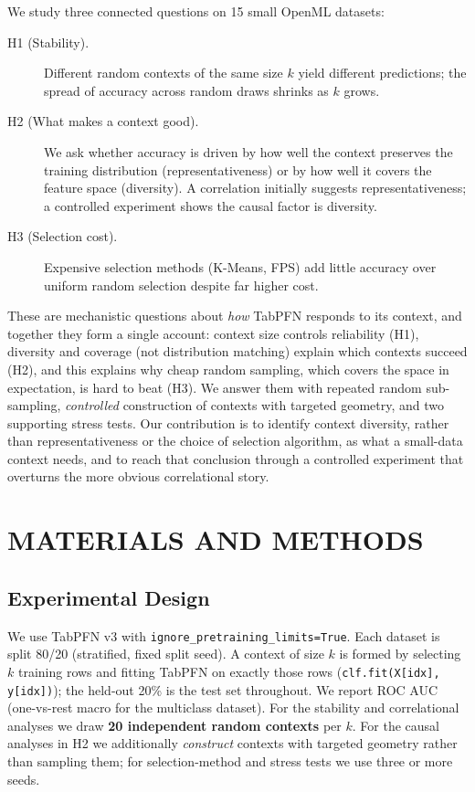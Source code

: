 \documentclass{article}
\begin{document}
We study three connected questions on 15 small OpenML datasets:

\begin{description}
\item[H1 (Stability).] Different random contexts of the same size $k$ yield different predictions; the spread of accuracy across random draws shrinks as $k$ grows.
\item[H2 (What makes a context good).] We ask whether accuracy is driven by how well the context preserves the training distribution (representativeness) or by how well it covers the feature space (diversity). A correlation initially suggests representativeness; a controlled experiment shows the causal factor is diversity.
\item[H3 (Selection cost).] Expensive selection methods (K-Means, FPS) add little accuracy over uniform random selection despite far higher cost.
\end{description}

These are mechanistic questions about \emph{how} TabPFN responds to its context, and together they form a single account: context size controls reliability (H1), diversity and coverage (not distribution matching) explain which contexts succeed (H2), and this explains why cheap random sampling, which covers the space in expectation, is hard to beat (H3). We answer them with repeated random sub-sampling, \emph{controlled} construction of contexts with targeted geometry, and two supporting stress tests. Our contribution is to identify context diversity, rather than representativeness or the choice of selection algorithm, as what a small-data context needs, and to reach that conclusion through a controlled experiment that overturns the more obvious correlational story.

\section{MATERIALS AND METHODS}

\subsection{Experimental Design}

We use TabPFN v3 with \texttt{ignore\_pretraining\_limits=True}. Each dataset is split 80/20 (stratified, fixed split seed). A context of size $k$ is formed by selecting $k$ training rows and fitting TabPFN on exactly those rows (\texttt{clf.fit(X[idx], y[idx])}); the held-out 20\% is the test set throughout. We report ROC AUC (one-vs-rest macro for the multiclass dataset). For the stability and correlational analyses we draw \textbf{20 independent random contexts} per $k$. For the causal analyses in H2 we additionally \emph{construct} contexts with targeted geometry rather than sampling them; for selection-method and stress tests we use three or more seeds.
\end{document}

